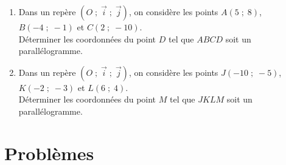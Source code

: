 \documentclass[11pt]{article}
\begin{document}
\begin{exercice}[1]

\begin{enumerate}[itemsep=1em]
\item Dans un repère $(O\;;\;\vec{i}\;;\;\vec{j})$, on considère les points $A(5\;;\;8)$, $B(-4\;;\;-1)$ et $C(2\;;\;-10)$.\\Déterminer les coordonnées du point $D$ tel que $ABCD$ soit un parallélogramme.
\item Dans un repère $(O\;;\;\vec{i}\;;\;\vec{j})$, on considère les points $J(-10\;;\;-5)$, $K(-2\;;\;-3)$ et $L(6\;;\;4)$.\\Déterminer les coordonnées du point $M$ tel que $JKLM$ soit un parallélogramme.
\end{enumerate}
\end{exercice}

\section{Problèmes}
\end{document}
